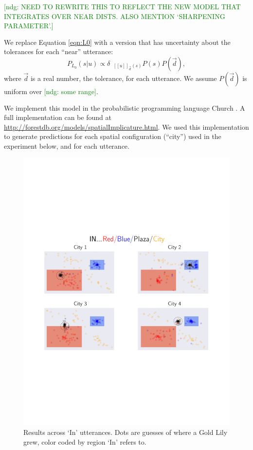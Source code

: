 \documentclass[10pt,letterpaper]{article}
\newcommand{\denote}[1]{\mbox{ $[\![ #1 ]\!]$}}
\newcommand{\ndg}[1]{\textcolor{Green}{[ndg: #1]}}
\begin{document}
\ndg{NEED TO REWRITE THIS TO REFLECT THE NEW MODEL THAT INTEGRATES OVER NEAR DISTS. ALSO MENTION `SHARPENING PARAMETER'.}

We replace Equation \ref{eqn:L0} with a version that has uncertainty about the tolerances for each ``near'' utterance:
\begin{equation}
P_{L_0}(s|u)\propto \delta_{\denote{u}_{\vec{d}}(s)} P(s) P(\vec{d})\label{eqn:L0tol},
\end{equation}
where $\vec{d}$ is a real number, the tolerance, for each utterance. We assume $P(\vec{d})$ is uniform over \ndg{some range}.

We implement this model in the probabilistic programming language Church \cite{goodman2008}. A full implementation can be found at \url{http://forestdb.org/models/spatialImplicature.html}. We used this implementation to generate predictions for each spatial configuration (``city'') used in the experiment below, and for each utterance.


\begin{figure}[!t]
\center
\includegraphics[width=.82\textwidth]{figures/In.pdf}
\caption{Results across `In' utterances. Dots are guesses of where a Gold Lily grew, color coded by region `In' refers to.}
\label{fig:In}
\end{figure}
\end{document}
